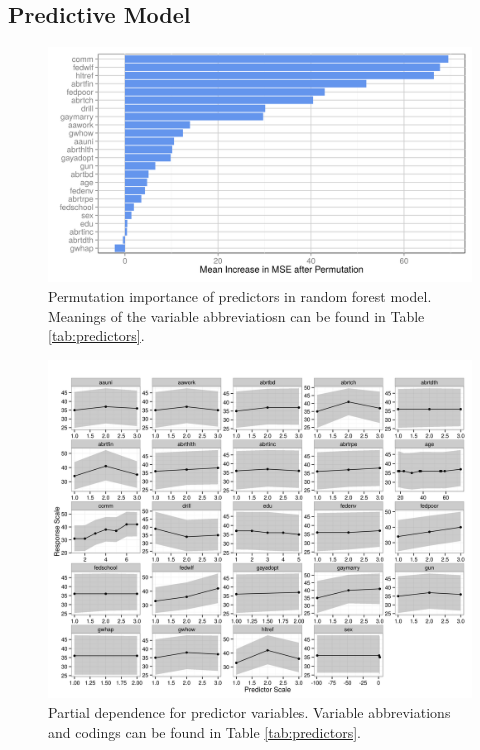 \subsection{Predictive Model}

\begin{figure}[ht!]
  \centering
  \includegraphics{../figures/main/varimp.png}
  \caption{Permutation importance of predictors in random forest model. Meanings of the variable abbreviatiosn can be found in Table \ref{tab:predictors}.}
  \label{fig:imp}
\end{figure}

\begin{figure}[ht!]
  \centering
  \includegraphics{../figures/main/partial_dependence.png}
  \caption{Partial dependence for predictor variables. Variable abbreviations and codings can be found in Table \ref{tab:predictors}.}
  \label{fig:pd}
\end{figure}

